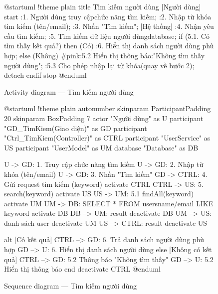 \documentclass[12pt,a4paper]{report}
\begin{document}
\begin{figure}[H]
    \centering
    \begin{plantuml}
        @startuml
        !theme plain
        title Tìm kiếm người dùng
        |Người dùng|
        start
        :1. Người dùng truy cập chức năng tìm kiếm;
        :2. Nhập từ khóa tìm kiếm (tên/email);
        :3. Nhấn "Tìm kiếm";
        |Hệ thống|
        :4. Nhận yêu cầu tìm kiếm;
        :5. Tìm kiếm dữ liệu người dùng\ntrong database;
        if (5.1. Có tìm thấy kết quả?) then (Có)
          :6. Hiển thị danh sách người dùng phù hợp;
        else (Không)
          #pink:5.2 Hiển thị thông báo:\n"Không tìm thấy người dùng";
          :5.3 Cho phép nhập lại từ khóa\n(quay về bước 2);
          detach
        endif
        stop
        @enduml
    \end{plantuml}
    \caption{Activity diagram --- Tìm kiếm người dùng}
\end{figure}

\begin{figure}[H]
    \centering
    \begin{plantuml}
        @startuml
        !theme plain
        autonumber
        skinparam ParticipantPadding 20
        skinparam BoxPadding 7
        actor "Người dùng" as U
        participant "GD_TimKiem\n(Giao diện)" as GD
        participant "Ctrl_TimKiem\n(Controller)" as CTRL
        participant "UserService" as US
        participant "UserModel" as UM
        database "Database" as DB

        U -> GD: 1. Truy cập chức năng tìm kiếm
        U -> GD: 2. Nhập từ khóa (tên/email)
        U -> GD: 3. Nhấn "Tìm kiếm"
        GD -> CTRL: 4. Gửi request tìm kiếm (keyword)
        activate CTRL
        CTRL -> US: 5. search(keyword)
        activate US
        US -> UM: 5.1 findAll(keyword)
        activate UM
        UM -> DB: SELECT * FROM users\nWHERE name/email LIKE keyword
        activate DB
        DB --> UM: result
        deactivate DB
        UM --> US: danh sách user
        deactivate UM
        US --> CTRL: result
        deactivate US

        alt [Có kết quả]
          CTRL --> GD: 6. Trả danh sách người dùng phù hợp
          GD --> U: 6. Hiển thị danh sách người dùng
        else [Không có kết quả]
          CTRL --> GD: 5.2 Thông báo "Không tìm thấy"
          GD --> U: 5.2 Hiển thị thông báo
        end
        deactivate CTRL
        @enduml
    \end{plantuml}
    \caption{Sequence diagram --- Tìm kiếm người dùng}
\end{figure}
\end{document}
